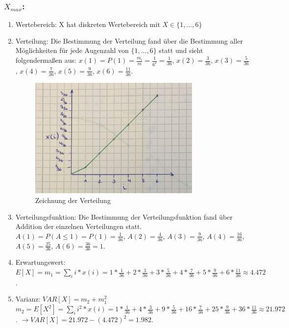 \documentclass[%
10pt,              %
ngerman,           %
a4paper,           %
DIV11,             %
]{scrartcl}%
\begin{document}
\subsubsection*{$X_{max}$:}

\begin{enumerate}
	\item Wertebereich: X hat diskreten Wertebereich mit $X \in \{1, \dots, 6 \}$
	\item Verteilung: Die Bestimmung der Verteilung fand über die Bestimmung aller Möglichkeiten für jede Augenzahl von $\{1, \dots, 6 \}$ statt und sieht folgendermaßen aus:\newline
	$x(1) = P(1) = \frac{m_i}{m} = \frac{1}{6^2} = \frac{1}{36}$,\newline
	$x(2) = \frac{3}{36}$, $x(3) = \frac{5}{36}$, $x(4) = \frac{7}{36}$, $x(5) = \frac{9}{36}$, $x(6) = \frac{11}{36}$. 
	
	\begin{figure}[!htbp]
		\centering
		\caption{Zeichnung der Verteilung}
		\includegraphics[width=0.8\textwidth]{X_max1.png}
	\end{figure}
	
	\item Verteilungsfunktion: Die Bestimmung der Verteilungsfunktion fand über Addition der einzelnen Verteilungen statt.\newline
	$A(1) = P(A \leq 1) = P(1) = \frac{1}{36}$,\newline
	$A(2) = \frac{4}{36}$, $A(3) = \frac{9}{36}$, $A(4) = \frac{16}{36}$, $A(5) = \frac{25}{36}$, $A(6) = \frac{36}{36} = 1$. 
	
	\item Erwartungswert: $E[X] = m_1 = \sum_{i} i * x(i) = 1 * \frac{1}{36} + 2 * \frac{3}{36} + 3 * \frac{5}{36} + 4 * \frac{7}{36} + 5 * \frac{9}{36} + 6 * \frac{11}{36} \approx 4.472$.
	\item Varianz: $VAR[X] = m_2 + m_1^2$\newline
	$m_2 = E[X^2] = \sum_{i} i^2 * x(i) = 1 * \frac{1}{36} + 4 * \frac{3}{36} + 9 * \frac{5}{36} + 16 * \frac{7}{36} + 25 * \frac{9}{36} + 36 * \frac{11}{36} \approx 21.972$.\newline
	$\rightarrow VAR[X] = 21.972 - (4.472)^2 = 1.982$.
\end{enumerate}
\end{document}
